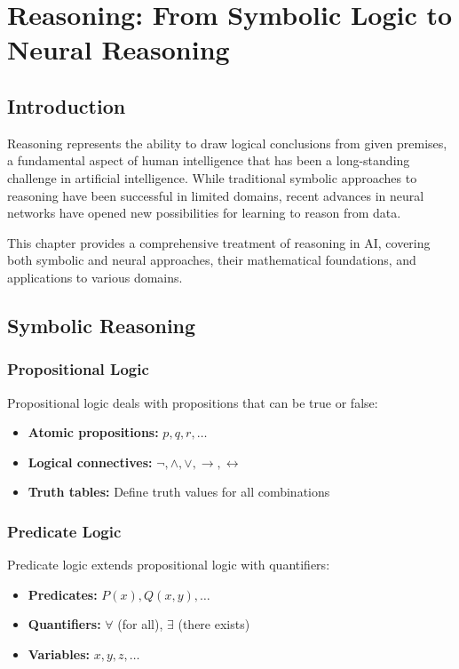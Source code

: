 \chapter{Reasoning: From Symbolic Logic to Neural Reasoning}

\section{Introduction}

Reasoning represents the ability to draw logical conclusions from given premises, a fundamental aspect of human intelligence that has been a long-standing challenge in artificial intelligence. While traditional symbolic approaches to reasoning have been successful in limited domains, recent advances in neural networks have opened new possibilities for learning to reason from data.

This chapter provides a comprehensive treatment of reasoning in AI, covering both symbolic and neural approaches, their mathematical foundations, and applications to various domains.

\section{Symbolic Reasoning}

\subsection{Propositional Logic}

Propositional logic deals with propositions that can be true or false:
\begin{itemize}
    \item \textbf{Atomic propositions:} $p, q, r, \ldots$
    \item \textbf{Logical connectives:} $\neg, \land, \lor, \rightarrow, \leftrightarrow$
    \item \textbf{Truth tables:} Define truth values for all combinations
\end{itemize}

\subsection{Predicate Logic}

Predicate logic extends propositional logic with quantifiers:
\begin{itemize}
    \item \textbf{Predicates:} $P(x), Q(x,y), \ldots$
    \item \textbf{Quantifiers:} $\forall$ (for all), $\exists$ (there exists)
    \item \textbf{Variables:} $x, y, z, \ldots$
\end{itemize}

